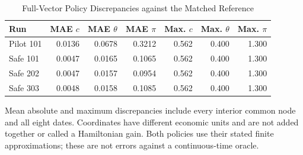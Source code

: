 \begin{table}[tbp]
\centering
\caption{Full-Vector Policy Discrepancies against the Matched Reference}
\label{tab:ndu_policy}
\small
\begin{tabular}{@{}lrrrrrr@{}}
\toprule
Run & MAE $c$ & MAE $\theta$ & MAE $\pi$ & Max. $c$ & Max. $\theta$ & Max. $\pi$ \\
\midrule
Pilot 101 & 0.0136 & 0.0678 & 0.3212 & 0.562 & 0.400 & 1.300 \\
Safe 101 & 0.0047 & 0.0165 & 0.1065 & 0.562 & 0.400 & 1.300 \\
Safe 202 & 0.0047 & 0.0157 & 0.0954 & 0.562 & 0.400 & 1.300 \\
Safe 303 & 0.0048 & 0.0158 & 0.1085 & 0.562 & 0.400 & 1.300 \\
\bottomrule
\end{tabular}
\par\smallskip\begin{minipage}{\linewidth}\footnotesize Mean absolute and maximum discrepancies include every interior common node and all eight dates. Coordinates have different economic units and are not added together or called a Hamiltonian gain. Both policies use their stated finite approximations; these are not errors against a continuous-time oracle.\end{minipage}
\end{table}
